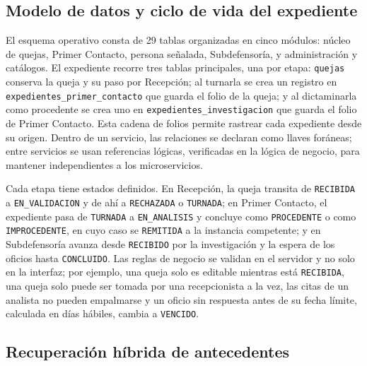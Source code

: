\documentclass[conference,letterpaper]{IEEEtran}
\begin{document}
\subsection{Modelo de datos y ciclo de vida del expediente}

El esquema operativo consta de 29 tablas organizadas en cinco módulos: núcleo de quejas, Primer Contacto, persona señalada, Subdefensoría, y administración y catálogos. El expediente recorre tres tablas principales, una por etapa: \texttt{quejas} conserva la queja y su paso por Recepción; al turnarla se crea un registro en \texttt{expedientes\_primer\_contacto} que guarda el folio de la queja; y al dictaminarla como procedente se crea uno en \texttt{expedientes\_investigacion} que guarda el folio de Primer Contacto. Esta cadena de folios permite rastrear cada expediente desde su origen. Dentro de un servicio, las relaciones se declaran como llaves foráneas; entre servicios se usan referencias lógicas, verificadas en la lógica de negocio, para mantener independientes a los microservicios.

Cada etapa tiene estados definidos. En Recepción, la queja transita de \texttt{RECIBIDA} a \texttt{EN\_VALIDACION} y de ahí a \texttt{RECHAZADA} o \texttt{TURNADA}; en Primer Contacto, el expediente pasa de \texttt{TURNADA} a \texttt{EN\_ANALISIS} y concluye como \texttt{PROCEDENTE} o como \texttt{IMPROCEDENTE}, en cuyo caso se \texttt{REMITIDA} a la instancia competente; y en Subdefensoría avanza desde \texttt{RECIBIDO} por la investigación y la espera de los oficios hasta \texttt{CONCLUIDO}. Las reglas de negocio se validan en el servidor y no solo en la interfaz; por ejemplo, una queja solo es editable mientras está \texttt{RECIBIDA}, una queja solo puede ser tomada por una recepcionista a la vez, las citas de un analista no pueden empalmarse y un oficio sin respuesta antes de su fecha límite, calculada en días hábiles, cambia a \texttt{VENCIDO}.

\subsection{Recuperación híbrida de antecedentes}
\end{document}

